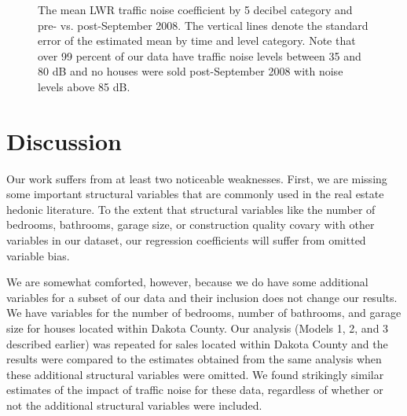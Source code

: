 \documentclass{article}\usepackage{graphicx, color}
\begin{document}
\begin{figure}
\caption{The mean LWR traffic noise coefficient by 5 decibel category and pre- vs. post-September 2008. The vertical lines denote the standard error of the estimated mean by time and level category. Note that over 99 percent of our data have traffic noise levels between 35 and 80 dB and no houses were sold post-September 2008 with noise levels above 85 dB.}\label{fig:betaMAXvCat}
\end{figure}


\section{Discussion}\label{Discussion}

Our work suffers from at least two noticeable weaknesses. First, we are missing some important structural variables that are commonly used in the real estate hedonic literature. To the extent that structural variables like the number of bedrooms, bathrooms, garage size, or construction quality covary with other variables in our dataset, our regression coefficients will suffer from omitted variable bias. 

We are somewhat comforted, however, because we do have some additional variables for a subset of our data and their inclusion does not change our results. We have variables for the number of bedrooms, number of bathrooms, and garage size for houses located within Dakota County. Our analysis (Models 1, 2, and 3 described earlier) was repeated for sales located within Dakota County and the results were compared to the estimates obtained from the same analysis when these additional structural variables were omitted. We found strikingly similar estimates of the impact of traffic noise for these data, regardless of whether or not the additional structural variables were included.
\end{document}
